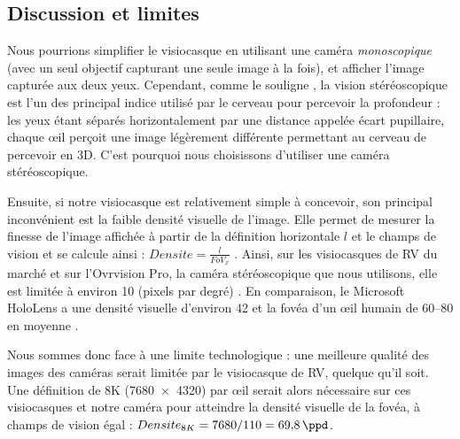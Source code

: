 \subsection{Discussion et limites}
Nous pourrions simplifier le visiocasque en utilisant une caméra \emph{monoscopique} (avec un seul objectif capturant une seule image à la fois), et afficher l'image capturée aux deux yeux. Cependant, comme le souligne \cite{Bourke1999}, la vision stéréoscopique est l'un des principal indice utilisé par le cerveau pour percevoir la profondeur : les yeux étant séparés horizontalement par une distance appelée écart pupillaire, chaque \oe il perçoit une image légèrement différente  permettant au cerveau de percevoir en 3D. C'est pourquoi nous choisissons d'utiliser une caméra stéréoscopique.


Ensuite, si notre visiocasque est relativement simple à concevoir, son principal inconvénient est la faible densité visuelle de l'image. Elle permet de mesurer la finesse de l'image affichée à partir de la définition horizontale $l$ et le champs de vision et se calcule ainsi : $Densite = \frac{l}{FoV_x}$ \citep{Boger2017}. Ainsi, sur les visiocasques de RV du marché et sur l'Ovrvision Pro, la caméra stéréoscopique que nous utilisons, elle est limitée à environ \SI{10}{\ppd} (pixels par degré) . En comparaison, le Microsoft HoloLens a une densité visuelle d'environ \SI{42}{\ppd} et la fovéa d'un \oe il humain de \SIrange{60}{80}{\ppd} en moyenne \citep{Kistner2014}.

Nous sommes donc face à une limite technologique : une meilleure qualité des images des caméras serait limitée par le visiocasque de RV, quelque qu'il soit. Une définition de 8K (\SI{7680x4320}{\px}) par \oe il serait alors nécessaire sur ces visiocasques et notre caméra pour atteindre la densité visuelle de la fovéa, à champs de vision égal : $Densite_{8K} = 7680 / 110 = \SI{69.8}{\ppd}$.

